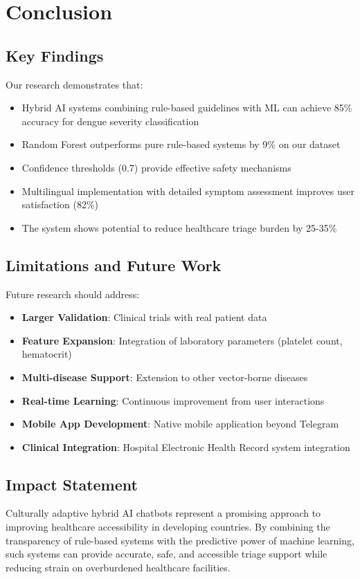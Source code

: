 \documentclass[conference]{IEEEtran}
\begin{document}
\section{Conclusion}

\subsection{Key Findings}
Our research demonstrates that:

\begin{itemize}
\item Hybrid AI systems combining rule-based guidelines with ML can achieve 85\% accuracy for dengue severity classification
\item Random Forest outperforms pure rule-based systems by 9\% on our dataset
\item Confidence thresholds (0.7) provide effective safety mechanisms
\item Multilingual implementation with detailed symptom assessment improves user satisfaction (82\%)
\item The system shows potential to reduce healthcare triage burden by 25-35\%
\end{itemize}

\subsection{Limitations and Future Work}
Future research should address:

\begin{itemize}
\item \textbf{Larger Validation}: Clinical trials with real patient data
\item \textbf{Feature Expansion}: Integration of laboratory parameters (platelet count, hematocrit)
\item \textbf{Multi-disease Support}: Extension to other vector-borne diseases
\item \textbf{Real-time Learning}: Continuous improvement from user interactions
\item \textbf{Mobile App Development}: Native mobile application beyond Telegram
\item \textbf{Clinical Integration}: Hospital Electronic Health Record system integration
\end{itemize}

\subsection{Impact Statement}
Culturally adaptive hybrid AI chatbots represent a promising approach to improving healthcare accessibility in developing countries. By combining the transparency of rule-based systems with the predictive power of machine learning, such systems can provide accurate, safe, and accessible triage support while reducing strain on overburdened healthcare facilities.
\end{document}

